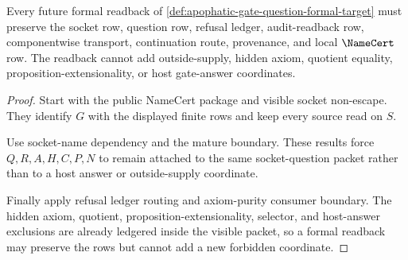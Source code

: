 \begin{theorem}
\label{thm:apophatic-gate-question-formal-target-readback}
Every future formal readback of \autoref{def:apophatic-gate-question-formal-target} must preserve the socket row, question row, refusal ledger, audit-readback row, componentwise transport, continuation route, provenance, and local $\NameCert$ row. The readback cannot add outside-supply, hidden axiom, quotient equality, proposition-extensionality, or host gate-answer coordinates.
\end{theorem}
\begin{proof}
Start with the public NameCert package and visible socket non-escape. They identify $G$ with the displayed finite rows and keep every source read on $S$.

Use socket-name dependency and the mature boundary. These results force $Q,R,A,H,C,P,N$ to remain attached to the same socket-question packet rather than to a host answer or outside-supply coordinate.

Finally apply refusal ledger routing and axiom-purity consumer boundary. The hidden axiom, quotient, proposition-extensionality, selector, and host-answer exclusions are already ledgered inside the visible packet, so a formal readback may preserve the rows but cannot add a new forbidden coordinate.
\end{proof}


